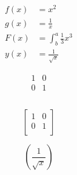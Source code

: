 \documentclass{article}
\begin{document}
\begin{align*}
  f(x) &= x^2\\
  g(x) &= \frac{1}{x}\\
  F(x) &= \int^a_b \frac{1}{3}x^3\\
  y(x) &= \frac{1}{\sqrt{x}}
\end{align*}

\begin{equation}
\begin{matrix}
1 & 0\\
0 & 1
\end{matrix}
\end{equation}

\begin{equation}
[
\begin{matrix}
1 & 0\\
0 & 1
\end{matrix}
]
\end{equation}

\begin{equation*}
\left[
\begin{matrix}
  1 & 0\\
  0 & 1\\
\end{matrix}
\right]
\end{equation*}

\begin{equation*}
\left(\frac{1}{\sqrt{x}}\right)
\end{equation*}
 
\end{document}
